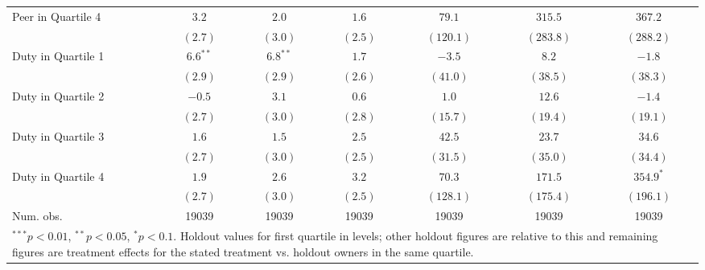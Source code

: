 \begin{center}
\begin{longtable}{l c c c c c c }
Peer in Quartile 4         & $3.2$         & $2.0$         & $1.6$        & $79.1$        & $315.5$        & $367.2$        \\
                           & $(2.7)$       & $(3.0)$       & $(2.5)$      & $(120.1)$     & $(283.8)$      & $(288.2)$      \\
Duty in Quartile 1         & $6.6^{**}$    & $6.8^{**}$    & $1.7$        & $-3.5$        & $8.2$          & $-1.8$         \\
                           & $(2.9)$       & $(2.9)$       & $(2.6)$      & $(41.0)$      & $(38.5)$       & $(38.3)$       \\
Duty in Quartile 2         & $-0.5$        & $3.1$         & $0.6$        & $1.0$         & $12.6$         & $-1.4$         \\
                           & $(2.7)$       & $(3.0)$       & $(2.8)$      & $(15.7)$      & $(19.4)$       & $(19.1)$       \\
Duty in Quartile 3         & $1.6$         & $1.5$         & $2.5$        & $42.5$        & $23.7$         & $34.6$         \\
                           & $(2.7)$       & $(3.0)$       & $(2.5)$      & $(31.5)$      & $(35.0)$       & $(34.4)$       \\
Duty in Quartile 4         & $1.9$         & $2.6$         & $3.2$        & $70.3$        & $171.5$        & $354.9^{*}$    \\
                           & $(2.7)$       & $(3.0)$       & $(2.5)$      & $(128.1)$     & $(175.4)$      & $(196.1)$      \\
\hline
Num. obs.                  & 19039         & 19039         & 19039        & 19039         & 19039          & 19039          \\
\hline
\multicolumn{7}{l}{\scriptsize{\parbox{.75\linewidth}{$^{***}p<0.01$, $^{**}p<0.05$, $^*p<0.1$. Holdout values for first quartile in levels; other holdout figures are relative to this and remaining figures are treatment effects for the stated treatment vs. holdout owners in the same quartile.}}}\\
\end{longtable}
\end{center}

